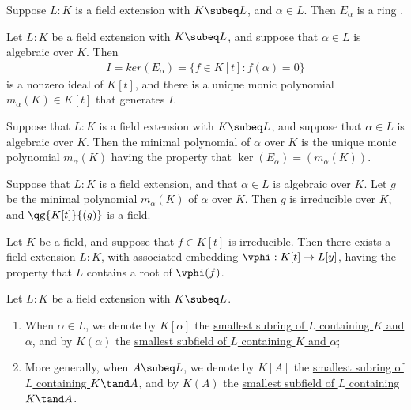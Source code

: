 \documentclass{article}
\begin{document}
  \begin{tproposition}
    Suppose \( L: K \) is a field extension with \( K \subeq L \), and \( \alpha\in L \).
     Then \( E_\alpha \) is a ring \homo.
  \end{tproposition}

  \begin{tproposition}
    Let \( L : K \) be a field extension with \( K \subeq L \), and suppose that \( \alpha\in L \) is algebraic over \( K \).
    Then \begin{align*}
      I = ker(E_\alpha) = \{f \in K[t] : f(\alpha) = 0\}
    \end{align*}
    is a nonzero ideal of \( K[t] \), and there is a unique monic polynomial \( m_\alpha(K) \in K[t] \) that generates \( I \).
  \end{tproposition}

  \begin{tdefinition}
    Suppose that \( L : K \) is a field extension with \( K \subeq L \), and suppose that \( \alpha\in L \) is algebraic over \( K \).
    Then the minimal polynomial of \( \alpha \) over \( K \) is the unique monic polynomial \( m_\alpha(K) \) having the property that \( \ker(E_\alpha) = (m_\alpha(K)) \).
  \end{tdefinition}

  \begin{ttheorem}
    Suppose that \( L : K \) is a field extension, and that \( \alpha\in L \) is algebraic over \( K \).
    Let \( g \) be the minimal polynomial \( m_\alpha(K) \) of \( \alpha \) over \( K \).
    Then \( g \) is irreducible over \( K \), and \( \qg{K[t]}{(g)} \) is a field.
  \end{ttheorem}

  \begin{ttheorem}
    Let \( K \) be a field, and suppose that \( f\in K[t] \) is irreducible.
    Then there exists a field extension \( L:K \), with associated embedding \( \vphi:K[t]\to L[y] \), having the property that \( L \) contains a root of \( \vphi(f) \).
  \end{ttheorem}

  \begin{tdefinition}
    Let \( L:K \) be a field extension with \( K\subeq L \).
    \begin{enumerate}[label=(\roman*)]
      \item When \( \alpha\in L \), we denote by \( K[\alpha] \) the \ul{smallest subring of \( L \) containing \( K \) and \( \alpha \)}, and by \( K(\alpha) \) the \ul{smallest subfield of \( L \) containing \( K \) and \( \alpha \)};
      \item More generally, when \( A\subeq L \), we denote by \( K[A] \) the \ul{smallest subring of \( L \) containing \( K \tand A \)}, and by \( K(A) \) the \ul{smallest subfield of \( L \) containing \( K \tand A \)}.
    \end{enumerate}
  \end{tdefinition}
\end{document}
